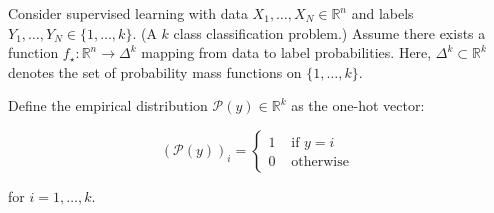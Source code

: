 \begin{definition}
    Consider supervised learning with data $X_{1}, \ldots, X_{N} \in \mathbb{R}^{n}$ and labels $Y_{1}, \ldots, Y_{N} \in\{1, \ldots, k\}$. (A $k$ class classification problem.) Assume there exists a function $f_{\star}: \mathbb{R}^{n} \rightarrow \Delta^{k}$ mapping from data to label probabilities. Here, $\Delta^{k} \subset \mathbb{R}^{k}$ denotes the set of probability mass functions on $\{1, \ldots, k\}$.

    Define the empirical distribution $\mathcal{P}(y) \in \mathbb{R}^{k}$ as the one-hot vector:

    $$
    (\mathcal{P}(y))_{i}=\left\{\begin{array}{cc}
    1 & \text { if } y=i \\
    0 & \text { otherwise }
    \end{array}\right.
    $$

    for $i=1, \ldots, k$.
\end{definition}

